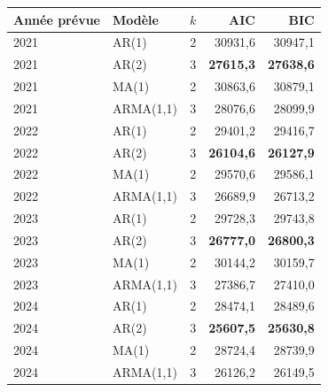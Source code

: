 \begin{tabular}{llrrr}
\toprule
Année prévue & Modèle & $k$ & AIC & BIC \\
\midrule
2021 & AR(1) & 2 & 30931,6 & 30947,1 \\
2021 & AR(2) & 3 & \textbf{27615,3} & \textbf{27638,6} \\
2021 & MA(1) & 2 & 30863,6 & 30879,1 \\
2021 & ARMA(1,1) & 3 & 28076,6 & 28099,9 \\
2022 & AR(1) & 2 & 29401,2 & 29416,7 \\
2022 & AR(2) & 3 & \textbf{26104,6} & \textbf{26127,9} \\
2022 & MA(1) & 2 & 29570,6 & 29586,1 \\
2022 & ARMA(1,1) & 3 & 26689,9 & 26713,2 \\
2023 & AR(1) & 2 & 29728,3 & 29743,8 \\
2023 & AR(2) & 3 & \textbf{26777,0} & \textbf{26800,3} \\
2023 & MA(1) & 2 & 30144,2 & 30159,7 \\
2023 & ARMA(1,1) & 3 & 27386,7 & 27410,0 \\
2024 & AR(1) & 2 & 28474,1 & 28489,6 \\
2024 & AR(2) & 3 & \textbf{25607,5} & \textbf{25630,8} \\
2024 & MA(1) & 2 & 28724,4 & 28739,9 \\
2024 & ARMA(1,1) & 3 & 26126,2 & 26149,5 \\
\bottomrule
\end{tabular}
